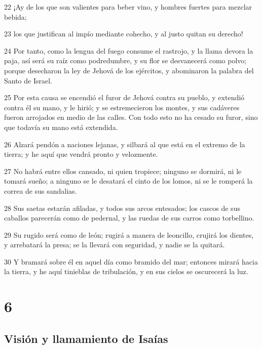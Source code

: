 \par 22 ¡Ay de los que son valientes para beber vino, y hombres fuertes para mezclar bebida;
\par 23 los que justifican al impío mediante cohecho, y al justo quitan su derecho!
\par 24 Por tanto, como la lengua del fuego consume el rastrojo, y la llama devora la paja, así será su raíz como podredumbre, y su flor se desvanecerá como polvo; porque desecharon la ley de Jehová de los ejércitos, y abominaron la palabra del Santo de Israel.
\par 25 Por esta causa se encendió el furor de Jehová contra su pueblo, y extendió contra él su mano, y le hirió; y se estremecieron los montes, y sus cadáveres fueron arrojados en medio de las calles. Con todo esto no ha cesado su furor, sino que todavía su mano está extendida.
\par 26 Alzará pendón a naciones lejanas, y silbará al que está en el extremo de la tierra; y he aquí que vendrá pronto y velozmente.
\par 27 No habrá entre ellos cansado, ni quien tropiece; ninguno se dormirá, ni le tomará sueño; a ninguno se le desatará el cinto de los lomos, ni se le romperá la correa de sus sandalias.
\par 28 Sus saetas estarán afiladas, y todos sus arcos entesados; los cascos de sus caballos parecerán como de pedernal, y las ruedas de sus carros como torbellino.
\par 29 Su rugido será como de león; rugirá a manera de leoncillo, crujirá los dientes, y arrebatará la presa; se la llevará con seguridad, y nadie se la quitará.
\par 30 Y bramará sobre él en aquel día como bramido del mar; entonces mirará hacia la tierra, y he aquí tinieblas de tribulación, y en sus cielos se oscurecerá la luz.

\chapter{6}

\section*{Visión y llamamiento de Isaías}

